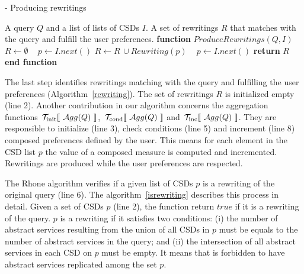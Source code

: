 \begin{algorithm}[h!]
\small
\caption{ - Producing rewritings}
\label{rewriting}
\begin{algorithmic}[1]
\REQUIRE A query $Q$ and a list of lists of CSDs $I$.
\ENSURE A set of rewritings $R$ that matches with the query and fulfill the user preferences.
\STATE \textbf{function} $\mathit{ProduceRewritings} (Q, I)$
	\STATE $R\leftarrow \emptyset$
	\STATE ~\! 
    \STATE $p \leftarrow I.next()$
			\STATE $R\leftarrow R\,\cup \mathit{Rewriting}(p)$
			\STATE ~\!
		\ENDIF
		\STATE $p \leftarrow I.\mathit{next}()$
	\ENDWHILE
    \STATE \textbf{return} $R$
\STATE \textbf{end function}
\end{algorithmic}
\end{algorithm}

%
The last step identifies rewritings matching with the query and fulfilling the user preferences (Algorithm~\ref{rewriting}). The set of rewritings $R$ is initialized empty (line 2).
%
%
Another contribution in our algorithm concerns the aggregation functions $~\!\hbox{${\cal T}_{\mathrm{init}} [\![\ {\cal A}{gg}(Q)\ ]\!]$}$, $~\!\hbox{${\cal T}_{\mathrm{cond}} [\![\ {\cal A}{gg}(Q)\ ]\!]$}$ and $~\!\hbox{${\cal T}_{\mathrm{inc}} [\![\ {\cal A}{gg}(Q)\ ]\!]$}$.
They are responsible to initialize (line 3), check conditions (line 5) and increment (line 8) composed preferences defined by the user.
This means for each element in the CSD list $p$ the value of a composed measure is computed and incremented. 
Rewritings are produced while the user preferences are respected. 

The Rhone algorithm verifies if a given list of CSDs $p$ is a rewriting of the original query (line 6). 
The algorithm~\ref{isrewriting} describes this process in detail. 
Given a set of CSDs $p$ (line 2), the function return $true$ if it is a rewriting of the query. 
$p$ is a rewriting if it satisfies two conditions: (i) the number of abstract services resulting from the union of all CSDs in $p$ must be equals to the number of abstract services in the query; and (ii) the intersection of all abstract services in each CSD on $p$ must be empty. 
It means that is forbidden to have abstract services replicated among the set $p$.

